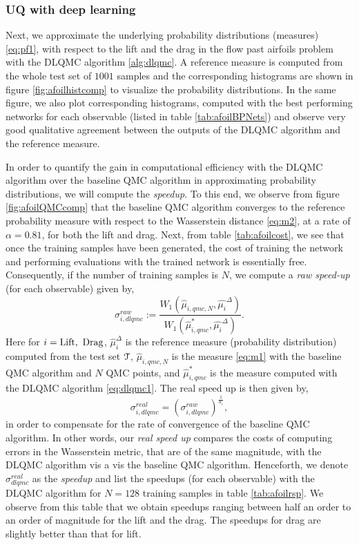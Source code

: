 \documentclass[a4paper]{article}
\numberwithin{equation}{section}
\numberwithin{equation}{section}
\theoremstyle{definition}
\theoremstyle{myremarkstyle}
\newcommand{\test}{\EuScript{T}}
\begin{document}
\subsubsection{UQ with deep learning}
Next, we approximate the underlying probability distributions (measures) \eqref{eq:pf1}, with respect to the lift and the drag in the flow past airfoils problem with the DLQMC algorithm \ref{alg:dlqmc}. A reference measure is computed from the whole test set of $1001$ samples and the corresponding histograms are shown in figure \ref{fig:afoilhistcomp} to visualize the probability distributions. In the same figure, we also plot corresponding histograms, computed with the best performing networks for each observable (listed in table \ref{tab:afoilBPNets}) and observe very good qualitative agreement between the outputs of the DLQMC algorithm and the reference measure.

In order to quantify the gain in computational efficiency with the DLQMC algorithm over the baseline QMC algorithm in approximating probability distributions, we will compute the \emph{speedup}. To this end, we observe from figure \ref{fig:afoilQMCcomp} that the baseline QMC algorithm converges to the reference probability measure with respect to the Wasserstein distance \eqref{eq:m2}, at a rate of $\alpha=0.81$, for both the lift and drag. Next, from table \ref{tab:afoilcost}, we see that once the training samples have been generated, the cost of training the network and performing evaluations with the trained network is essentially free. Consequently, if the number of training samples is $N$, we compute a \emph{raw speed-up} (for each observable) given by,
\begin{equation}
\label{eq:rsp1}
\sigma_{i,dlqmc}^{raw} := \frac{W_1\left(\hat{\mu}_{i,qmc,N},\hat{\mu_i}^{\Delta} \right)}{W_1\left(\hat{\mu}^{\ast}_{i,qmc},\hat{\mu_i}^{\Delta} \right)}.
\end{equation}
Here for $i={\rm Lift},~{\rm Drag}$, $\hat{\mu}_i^{\Delta}$ is the reference measure (probability distribution) computed from the test set $\test$, $\hat{\mu}_{i,qmc,N}$ is the measure \eqref{eq:m1} with the baseline QMC algorithm and $N$ QMC points, and $\hat{\mu}^{\ast}_{i,qmc}$ is the measure computed with the DLQMC algorithm \eqref{eq:dlqmc1}. The real speed up is then given by,
\begin{equation}
\label{eq:esp1}
\sigma_{i,dlqmc}^{real} = \left(\sigma_{i,dlqmc}^{raw}\right)^{\frac{1}{\alpha_i}},
\end{equation}
in order to compensate for the rate of convergence of the baseline QMC algorithm. In other words, our \emph{real speed up} compares the costs of computing errors in the Wasserstein metric, that are of the same magnitude, with the DLQMC algorithm vis a vis the baseline QMC algorithm. Henceforth, we denote $\sigma_{dlqmc}^{real}$ as the \emph{speedup} and list the speedups (for each observable) with the DLQMC algorithm for $N=128$ training samples in table \ref{tab:afoilrsp}. We observe from this table that  we obtain speedups ranging between half an order to an order of magnitude for the lift and the drag. The speedups for drag are slightly better than that for lift. 
\end{document}
